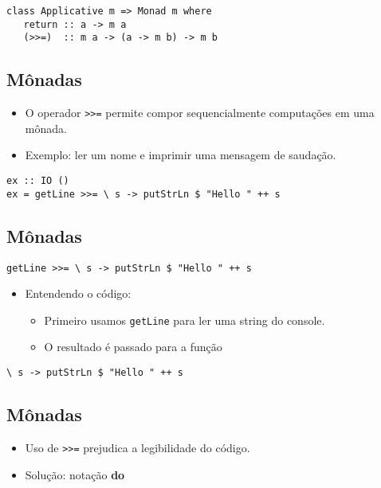 \documentclass[11pt]{article}
\begin{document}
\begin{verbatim}
class Applicative m => Monad m where
   return :: a -> m a
   (>>=)  :: m a -> (a -> m b) -> m b
\end{verbatim}
\subsection*{Mônadas}
\label{sec:org78463e6}

\begin{itemize}
\item O operador \texttt{>{}>{}=} permite compor sequencialmente computações em uma mônada.

\item Exemplo: ler um nome e imprimir uma mensagem de saudação.
\end{itemize}

\begin{verbatim}
ex :: IO ()
ex = getLine >>= \ s -> putStrLn $ "Hello " ++ s
\end{verbatim}
\subsection*{Mônadas}
\label{sec:org4f5e5ea}

\begin{verbatim}
getLine >>= \ s -> putStrLn $ "Hello " ++ s
\end{verbatim}

\begin{itemize}
\item Entendendo o código:
\begin{itemize}
\item Primeiro usamos \texttt{getLine} para ler uma string do console.
\item O resultado é passado para a função
\end{itemize}
\end{itemize}

\begin{verbatim}
\ s -> putStrLn $ "Hello " ++ s
\end{verbatim}
\subsection*{Mônadas}
\label{sec:org8fddda5}

\begin{itemize}
\item Uso de \texttt{>{}>{}=} prejudica a legibilidade do código.

\item Solução: notação \textbf{do}
\end{itemize}
\end{document}
